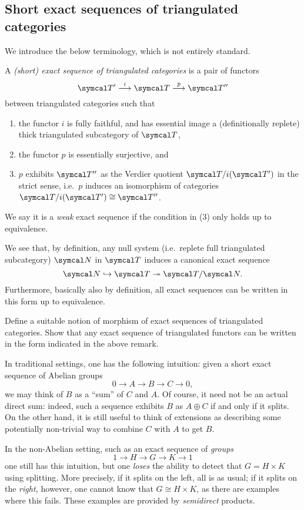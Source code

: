 \subsection{Short exact sequences of triangulated categories}
We introduce the below terminology, which is not entirely standard.
\begin{definition}
	A \emph{(short) exact sequence of triangulated categories} is a pair of functors
	\[ \calT' \overset{i}\longto \calT \overset{p}\longto \calT'' \]
	between triangulated categories such that
	\begin{enumerate}[label=(\arabic*)]
	\item the functor \(i\) is fully faithful, and has essential image a (definitionally replete) thick triangulated subcategory of \(\calT\),
	\item the functor \(p\) is essentially surjective, and
	\item \(p\) exhibits \(\calT''\) as the Verdier quotient \(\calT/i(\calT')\) in the strict sense, i.e.\ \(p\) induces an isomorphism of categories \(\calT/i(\calT')\cong\calT''\).
	\end{enumerate}
	We say it is a \emph{weak} exact sequence if the condition in (3) only holds up to equivalence.
\end{definition}
\begin{remark}
	We see that, by definition, any null system (i.e.\ replete full triangulated subcategory) \(\calN\) in \(\calT\) induces a canonical exact sequence
	\[ \calN\inj\calT\sur\calT/\calN. \]
	Furthermore, basically also by definition, all exact sequences can be written in this form up to equivalence.
\end{remark}
\begin{exercise}
	Define a suitable notion of morphism of exact sequences of triangulated categories. Show that any exact sequence of triangulated functors can
	be written in the form indicated in the above remark.
\end{exercise}

In traditional settings, one has the following intuition: given a short exact sequence of Abelian groups
\[ 0 \to A \to B \to C \to 0, \]
we may think of \(B\) as a ``sum'' of \(C\) and \(A\). Of course, it need not be an actual direct sum: indeed, such a sequence exhibits \(B\) as \(A\oplus C\) if and only if it splits.
On the other hand, it is still useful to think of extensions as describing some potentially non-trivial way to combine \(C\) with \(A\) to get \(B\).

In the non-Abelian setting, such as an exact sequence of \emph{groups}
\[ 1 \to H \to G \to K \to 1 \]
one still has this intuition, but one \emph{loses} the ability to detect that \(G = H\times K\) using splitting. More precisely, if it splits on the left, all is as usual; if it splits on the \emph{right,} however,
one cannot know that \(G\cong H\times K\), as there are examples where this fails. These examples are provided by \emph{semidirect} products.


